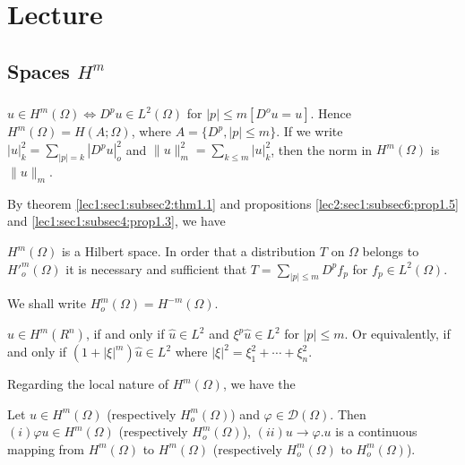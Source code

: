 \chapter{Lecture}\label{lec3}%

\setcounter{section}{1}
\section{Spaces \texorpdfstring{$H^m$}{Hm}}\pageoriginale\label{lec3:sec2} %

\subsection{}\label{lec3:sec2:subsec1}

\begin{definition}\label{lec3:sec2:subsec1:def2.1}%
$u \in H^m (\Omega) \Leftrightarrow D^p u \in L^2
  (\Omega)$ for $|p|\le m [D^o u=u]$. Hence $H^m (\Omega) = H (A;
  \Omega)$, where  $A= \{ D^p, |p|\le m \}$. If we write $|u|^2_k=
  \sum \limits _{|p|=k}|D^pu|^2_o$ and $\parallel u \parallel ^2_m
  =\sum\limits_{k \leq m} |u|^2_k$, then the norm in $H^m(\Omega)$ is
  $\parallel u \parallel _m$. 
\end{definition}

By theorem \ref{lec1:sec1:subsec2:thm1.1} and propositions \ref{lec2:sec1:subsec6:prop1.5} and \ref{lec1:sec1:subsec4:prop1.3}, we have   
\begin{theorem}\label{lec3:sec2:subsec1:thm2.1}%
$H^m(\Omega)$ is a Hilbert space. In order that a distribution $T$ on
  $\Omega$ belongs to $H'^m_o(\Omega)$ it is necessary and sufficient
  that $T = \sum\limits_{|p|\le m} D^p f_p$ for $f_p \in L^2
  (\Omega)$. 
\end{theorem}

We shall write $H_o^m(\Omega) = H^{-m}(\Omega)$.

\begin{proposition}\label{lec3:sec2:subsec1:prop2.1}%
  $u \in H^m (R^n)$, if and only if $\hat{u} \in L^2$
  and $\xi^p \hat{u} \in L^2$ for $|p|\le m$. Or equivalently,
  if and only if $(1+|\xi|^m) \hat{u} \in L^2$ where $|\xi|^2
  = \xi^2_1+ \cdots + \xi ^2_n$. 
\end{proposition}

Regarding the local nature of $H^m (\Omega)$, we have the 
\begin{proposition}\label{lec3:sec2:subsec1:prop2.2}%
  Let $u \in H^m (\Omega)$ (respectively $H^m_o (\Omega)$) and
  $\varphi \in \mathscr{D}(\Omega)$. Then $(i)\varphi u
  \in H^m (\Omega)$ (respectively $H^m_o (\Omega)$), $(ii) u \to
  \varphi. u$ is a continuous mapping from $H^m (\Omega)$ to
  $H^m(\Omega)$ (respectively $H^m_o (\Omega)$ to $H^m_o(\Omega)$). 
\end{proposition}

